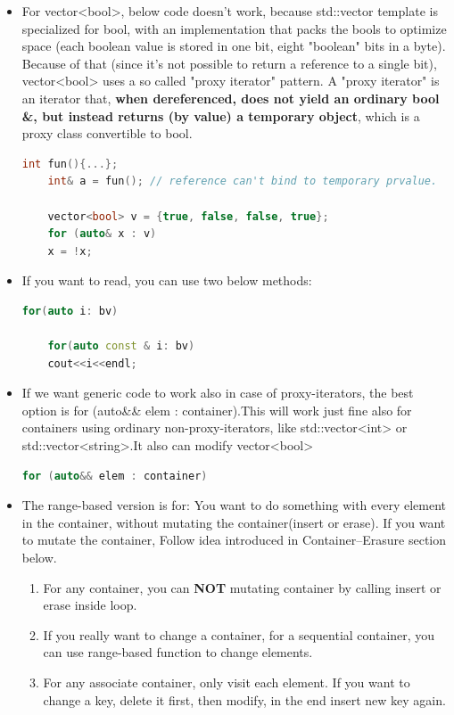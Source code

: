 \documentclass[a4paper,12pt,twoside]{book}
\begin{document}
\begin{itemize}
\begin{enumerate}
	\end{enumerate}
	
	
	\item For vector<bool>, below code doesn't work, because std::vector template is specialized for bool, with an implementation that packs the bools to optimize space (each boolean value is stored in one bit, eight "boolean" bits in a byte). Because of that (since it's not possible to return a reference to a single bit), vector<bool> uses a so called "proxy iterator" pattern. A "proxy iterator" is an iterator that, \textbf{when dereferenced, does not yield an ordinary bool \&, but instead returns (by value) a temporary object}, which is a proxy class convertible to bool. 
	\begin{lstlisting}[frame=single, language=c++]
	int fun(){...};
	int& a = fun(); // reference can't bind to temporary prvalue.
	
	vector<bool> v = {true, false, false, true};
	for (auto& x : v)
	x = !x;
	\end{lstlisting}
	
	\item If you want to read, you can use two below methods:
	\begin{lstlisting}[frame=single, language=c++]
	for(auto i: bv)
	
	for(auto const & i: bv)
	cout<<i<<endl;
	\end{lstlisting}
	
	\item If we want generic code to work also in case of proxy-iterators, the best option is for (auto\&\& elem : container).This will work just fine also for containers using ordinary non-proxy-iterators, like std::vector<int> or std::vector<string>.It also can modify vector<bool> 
	\begin{lstlisting}[frame=single, language=c++]
	for (auto&& elem : container)
	\end{lstlisting}
	
	\item The range-based version is for: You want to do something with every element in the container, without mutating the container(insert or erase). If you want to mutate the container, Follow idea introduced in Container--Erasure section below.
	
	\begin{enumerate}
		\item For any container, you can \textbf{NOT} mutating container by calling insert or erase inside loop.
		\item If you really want to change a container, for a sequential container, you can use range-based function to change elements. 
		\item For any associate container, only visit each element. If you want to change a key, delete it first, then modify, in the end insert new key again. 
	\end{enumerate}
	
\end{itemize}
\end{document}
